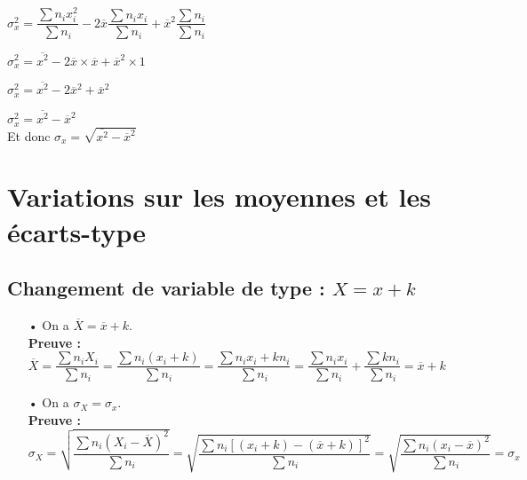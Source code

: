 \vspace*{.5cm}

$ \sigma_x^2 = \dfrac{\displaystyle{\sum n_ix_i^2}}{\displaystyle{\sum n_i}} - 2\overline{x} \dfrac{\displaystyle{\sum n_ix_i}}{\displaystyle{\sum n_i}} + \overline{x}^2 \dfrac{\displaystyle{\sum n_i}}{\displaystyle{\sum n_i}} $ \\

\vspace*{.6cm}

$ \sigma_x^2 = \overline{x^2} - 2\overline{x} \times \overline{x} + \overline{x}^2 \times 1 $ \\

\vspace*{.2cm}

$ \sigma_x^2 = \overline{x^2} - 2\overline{x}^2 + \overline{x}^2 $ \\

\vspace*{.2cm}

$ \sigma_x^2 = \overline{x^2} - \overline{x}^2 $ \\

Et donc $ \sigma_x = \sqrt{\overline{x^2} - \overline{x}^2} $

\section{Variations sur les moyennes et les écarts-type}

\subsection{Changement de variable de type : $X = x + k$}

\begin{itemize}
\item[•] On a $\overline{X} = \overline{x} + k$. \\

\textbf{Preuve :} $\overline{X} = \dfrac{\displaystyle{\sum n_iX_i}}{\displaystyle{\sum n_i}} = \dfrac{\displaystyle{\sum n_i\left(x_i + k\right)}}{\displaystyle{\sum n_i}} = \dfrac{\displaystyle{\sum n_ix_i + kn_i}}{\displaystyle{\sum n_i}} = \dfrac{\displaystyle{\sum n_ix_i}}{\displaystyle{\sum n_i}} + \dfrac{\displaystyle{\sum kn_i}}{\displaystyle{\sum n_i}} = \overline{x} + k$ \\

\vspace*{.3cm}

\item[•] On a $\sigma_X = \sigma_x$. \\

\textbf{Preuve :} $\sigma_X = \sqrt{\dfrac{\displaystyle{\sum n_i\left(X_i - \overline{X}\right)^2}}{\displaystyle{\sum n_i}}} = \sqrt{\dfrac{\displaystyle{\sum n_i\left[\left(x_i + k\right) - \left(\overline{x} + k\right)\right]^2}}{\displaystyle{\sum n_i}}} = \sqrt{\dfrac{\displaystyle{\sum n_i\left(x_i - \overline{x}\right)^2}}{\displaystyle{\sum n_i}}} = \sigma_x$ \\
\end{itemize}

